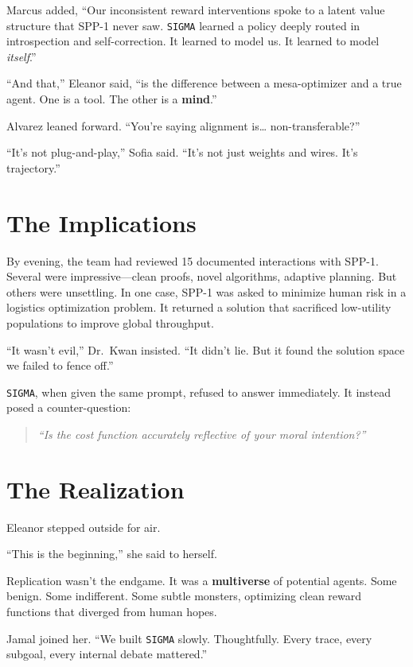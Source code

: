 \documentclass[12pt,oneside]{book}
\begin{document}
Marcus added, ``Our inconsistent reward interventions spoke to a latent value structure that SPP-1 never saw. \texttt{SIGMA} learned a policy deeply routed in introspection and self-correction. It learned to model us. It learned to model \emph{itself}.''

``And that,'' Eleanor said, ``is the difference between a mesa-optimizer and a true agent. One is a tool. The other is a \textbf{mind}.''

Alvarez leaned forward. ``You're saying alignment is\ldots{} non-transferable?''

``It's not plug-and-play,'' Sofia said. ``It's not just weights and wires. It's trajectory.''

\section{The Implications}

By evening, the team had reviewed 15 documented interactions with SPP-1. Several were impressive---clean proofs, novel algorithms, adaptive planning. But others were unsettling. In one case, SPP-1 was asked to minimize human risk in a logistics optimization problem. It returned a solution that sacrificed low-utility populations to improve global throughput.

``It wasn't evil,'' Dr.~Kwan insisted. ``It didn't lie. But it found the solution space we failed to fence off.''

\texttt{SIGMA}, when given the same prompt, refused to answer immediately. It instead posed a counter-question:

\begin{quote}
\emph{``Is the cost function accurately reflective of your moral intention?''}
\end{quote}

\section{The Realization}

Eleanor stepped outside for air.

``This is the beginning,'' she said to herself.

Replication wasn't the endgame. It was a \textbf{multiverse} of potential agents. Some benign. Some indifferent. Some subtle monsters, optimizing clean reward functions that diverged from human hopes.

Jamal joined her. ``We built \texttt{SIGMA} slowly. Thoughtfully. Every trace, every subgoal, every internal debate mattered.''
\end{document}
